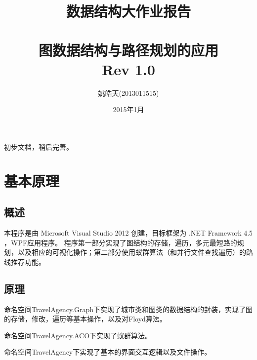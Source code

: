 \documentclass[12pt,a4paper]{article}
\author{姚皓天(2013011515)}
\title{数据结构大作业报告\\\ \\ 图数据结构与路径规划的应用\\ Rev 1.0}
\date{2015年1月}
\begin{document}
\maketitle
\thispagestyle{empty}
\newpage
初步文档，稍后完善。
\newpage
\thispagestyle{empty}
\renewcommand\contentsname{\textbf{目录}}
\tableofcontents
\newpage
\section{基本原理}
\subsection{概述}
本程序是由 Microsoft Visual Studio 2012 创建，目标框架为 .NET Framework 4.5 ，WPF应用程序。
程序第一部分实现了图结构的存储，遍历，多元最短路的规划，以及相应的可视化操作；第二部分使用蚁群算法（和并行文件查找遍历）的路线推荐功能。
\subsection{原理}
命名空间TravelAgency.Graph下实现了城市类和图类的数据结构的封装，实现了图的存储，修改，遍历等基本操作，以及对Floyd算法。\par
命名空间TravelAgency.ACO下实现了蚁群算法。\par
命名空间TravelAgency下实现了基本的界面交互逻辑以及文件操作。
\end{document}

